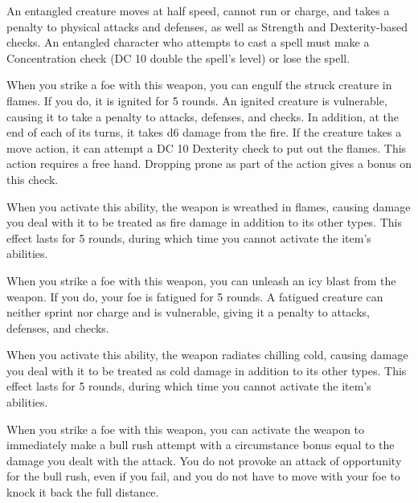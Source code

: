 An entangled creature moves at half speed, cannot run or charge, and takes a  penalty to physical attacks and defenses, as well as Strength and Dexterity-based checks. An entangled character who attempts to cast a spell must make a Concentration check (DC 10 \add double the spell's level) or lose the spell.


 When you strike a foe with this weapon, you can engulf the struck creature in flames. If you do, it is ignited for 5 rounds. An ignited creature is vulnerable, causing it to take a  penalty to attacks, defenses, and checks. In addition, at the end of each of its turns, it takes d6 damage from the fire. If the creature takes a move action, it can attempt a DC 10 Dexterity check to put out the flames. This action requires a free hand. Dropping prone as part of the action gives a  bonus on this check.

When you activate this ability, the weapon is wreathed in flames, causing damage you deal with it to be treated as fire damage in addition to its other types. This effect lasts for 5 rounds, during which time you cannot activate the item's abilities.


 When you strike a foe with this weapon, you can unleash an icy blast from the weapon. If you do, your foe is fatigued for 5 rounds. A fatigued creature can neither sprint nor charge and is vulnerable, giving it a  penalty to attacks, defenses, and checks.

When you activate this ability, the weapon radiates chilling cold, causing damage you deal with it to be treated as cold damage in addition to its other types. This effect lasts for 5 rounds, during which time you cannot activate the item's abilities.


 When you strike a foe with this weapon, you can activate the weapon to immediately make a bull rush attempt with a circumstance bonus equal to the damage you dealt with the attack. You do not provoke an attack of opportunity for the bull rush, even if you fail, and you do not have to move with your foe to knock it back the full distance.


